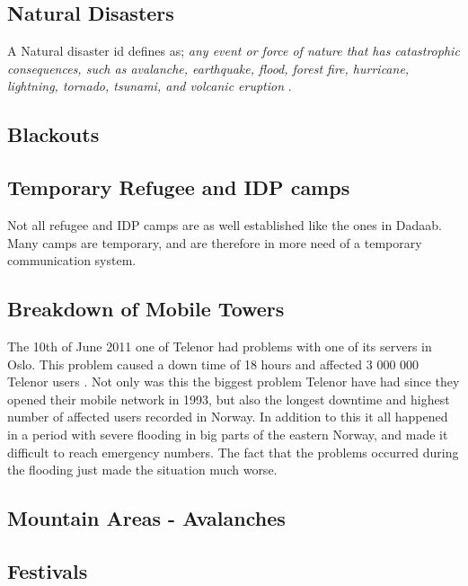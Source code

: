 \subsection{Natural Disasters}
A Natural disaster id defines as; \textit{any event or force of nature that has catastrophic consequences, such as avalanche, earthquake, flood, forest fire, hurricane, lightning, tornado, tsunami, and volcanic eruption} \cite{naturalDisaster}.


\subsection{Blackouts}

\subsection{Temporary Refugee and IDP camps}
Not all refugee and IDP camps are as well established like the ones in Dadaab. Many camps are temporary, and are therefore in more need of a temporary communication system. 

\subsection{Breakdown of Mobile Towers}


The 10th of June 2011 one of Telenor had problems with one of its servers in Oslo. This problem caused a down time of 18 hours and affected 3 000 000 Telenor users \cite{listeNedetid}. Not only was this the biggest problem Telenor have had since they opened their mobile network in 1993, but also the longest downtime and highest number of affected users recorded in Norway. In addition to this it all happened in a period with severe flooding in big parts of the eastern Norway, and made it difficult to reach emergency numbers. The fact that the problems occurred during the flooding just made the situation much worse. \cite{TelenorNede}

\subsection{Mountain Areas - Avalanches}

\subsection{Festivals}

